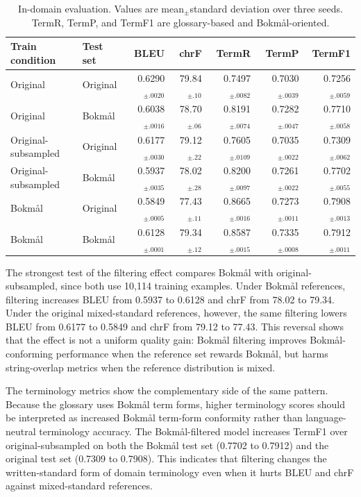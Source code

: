 \documentclass[11pt]{article}
\newcommand{\nb}{Bokm{\aa}l}
\begin{document}
\begin{table}[t]
\centering
\small
\begin{tabular}{llrrrrr}
\toprule
Train condition & Test set & BLEU & chrF & TermR & TermP & TermF1 \\
\midrule
Original & Original & 0.6290$_{\pm .0020}$ & 79.84$_{\pm .10}$ & 0.7497$_{\pm .0082}$ & 0.7030$_{\pm .0039}$ & 0.7256$_{\pm .0059}$ \\
Original & \nb{} & 0.6038$_{\pm .0016}$ & 78.70$_{\pm .06}$ & 0.8191$_{\pm .0074}$ & 0.7282$_{\pm .0047}$ & 0.7710$_{\pm .0058}$ \\
Original-subsampled & Original & 0.6177$_{\pm .0030}$ & 79.12$_{\pm .22}$ & 0.7605$_{\pm .0109}$ & 0.7035$_{\pm .0022}$ & 0.7309$_{\pm .0062}$ \\
Original-subsampled & \nb{} & 0.5937$_{\pm .0035}$ & 78.02$_{\pm .28}$ & 0.8200$_{\pm .0097}$ & 0.7261$_{\pm .0022}$ & 0.7702$_{\pm .0055}$ \\
\nb{} & Original & 0.5849$_{\pm .0005}$ & 77.43$_{\pm .11}$ & 0.8665$_{\pm .0016}$ & 0.7273$_{\pm .0011}$ & 0.7908$_{\pm .0013}$ \\
\nb{} & \nb{} & 0.6128$_{\pm .0001}$ & 79.34$_{\pm .12}$ & 0.8587$_{\pm .0015}$ & 0.7335$_{\pm .0008}$ & 0.7912$_{\pm .0011}$ \\
\bottomrule
\end{tabular}
\caption{In-domain evaluation. Values are mean$_{\pm}$standard deviation over three seeds. TermR, TermP, and TermF1 are glossary-based and \nb{}-oriented.}
\label{tab:indomain}
\end{table}

The strongest test of the filtering effect compares \nb{} with original-subsampled, since both use 10,114 training examples. Under \nb{} references, filtering increases BLEU from 0.5937 to 0.6128 and chrF from 78.02 to 79.34. Under the original mixed-standard references, however, the same filtering lowers BLEU from 0.6177 to 0.5849 and chrF from 79.12 to 77.43. This reversal shows that the effect is not a uniform quality gain: \nb{} filtering improves \nb{}-conforming performance when the reference set rewards \nb{}, but harms string-overlap metrics when the reference distribution is mixed.

The terminology metrics show the complementary side of the same pattern. Because the glossary uses \nb{} term forms, higher terminology scores should be interpreted as increased \nb{} term-form conformity rather than language-neutral terminology accuracy. The \nb{}-filtered model increases TermF1 over original-subsampled on both the \nb{} test set (0.7702 to 0.7912) and the original test set (0.7309 to 0.7908). This indicates that filtering changes the written-standard form of domain terminology even when it hurts BLEU and chrF against mixed-standard references.
\end{document}
